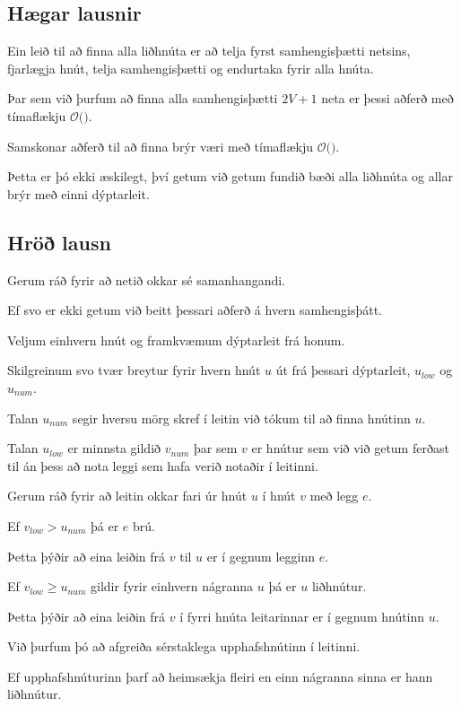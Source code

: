 \subsection{Hægar lausnir}
{
	{
		\item<1-> Ein leið til að finna alla liðhnúta er að telja fyrst samhengisþætti netsins, fjarlægja hnút, telja samhengisþætti
					og endurtaka fyrir alla hnúta.
		\item<2-> Þar sem við þurfum að finna alla samhengisþætti $2V + 1$ neta er þessi aðferð með tímaflækju $\mathcal{O}($\onslide<3->{$V^2 + VE$}$)$.
		\item<4-> Samskonar aðferð til að finna brýr væri með tímaflækju $\mathcal{O}($\onslide<5->{$E^2 + VE$}$)$.
		\item<6-> Þetta er þó ekki æskilegt, því getum við getum fundið bæði alla liðhnúta og allar brýr með einni dýptarleit.
	}
}

\subsection{Hröð lausn}
{
	{
		\item<1-> Gerum ráð fyrir að netið okkar sé samanhangandi.
		\item<2-> Ef svo er ekki getum við beitt þessari aðferð á hvern samhengisþátt.
		\item<3-> Veljum einhvern hnút og framkvæmum dýptarleit frá honum.
		\item<4-> Skilgreinum svo tvær breytur fyrir hvern hnút $u$ út frá þessari dýptarleit, $u_{low}$ og $u_{num}$.
		\item<5-> Talan $u_{num}$ segir hversu mörg skref í leitin við tókum til að finna hnútinn $u$.
		\item<6-> Talan $u_{low}$ er minnsta gildið $v_{num}$ þar sem $v$ er hnútur sem við við getum ferðast til án þess að nota leggi
					sem hafa verið notaðir í leitinni.
	}
}

{
	{
		\item<1-> Gerum ráð fyrir að leitin okkar fari úr hnút $u$ í hnút $v$ með legg $e$.
		\item<2-> Ef $v_{low} > u_{num}$ þá er $e$ brú.
		\item<3-> Þetta þýðir að eina leiðin frá $v$ til $u$ er í gegnum legginn $e$.
		\item<4-> Ef $v_{low} \geq u_{num}$ gildir fyrir einhvern nágranna $u$ þá er $u$ liðhnútur.
		\item<5-> Þetta þýðir að eina leiðin frá $v$ í fyrri hnúta leitarinnar er í gegnum hnútinn $u$.
		\item<6-> Við þurfum þó að afgreiða sérstaklega upphafshnútinn í leitinni.
		\item<7-> Ef upphafshnúturinn þarf að heimsækja fleiri en einn nágranna sinna er hann liðhnútur.
	}
}

